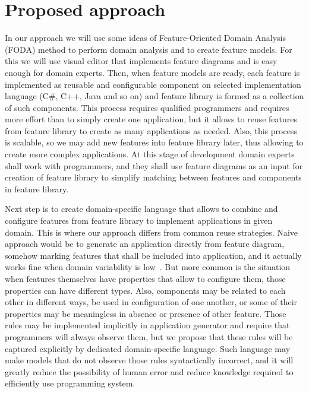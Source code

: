 \documentclass[conference]{IEEEtran}
\begin{document}
\section{Proposed approach}
\label{chapter:proposed}
In our approach we will use some ideas of Feature-Oriented Domain Analysis (FODA) method to perform domain analysis and to create feature models. For this we will use visual editor that implements feature diagrams and is easy enough for domain experts. Then, when feature models are ready, each feature is implemented as reusable and configurable component on selected implementation language (C\#, C++, Java and so on) and feature library is formed as a collection of such components. This process requires qualified programmers and requires more effort than to simply create one application, but it allows to reuse features from feature library to create as many applications as needed. Also, this process is scalable, so we may add new features into feature library later, thus allowing to create more complex applications. At this stage of development domain experts shall work with programmers, and they shall use feature diagrams as an input for creation of feature library to simplify matching between features and components in feature library.

Next step is to create domain-specific language that allows to combine and configure features from feature library to implement applications in given domain. This is where our approach differs from common reuse strategies. Naive approach would be to generate an application directly from feature diagram, somehow marking features that shall be included into application, and it actually works fine when domain variability is low~\cite{she2010variability}. But more common is the situation when features themselves have properties that allow to configure them, those properties can have different types. Also, components may be related to each other in different ways, be used in configuration of one another, or some of their properties may be meaningless in absence or presence of other feature. Those rules may be implemented implicitly in application generator and require that programmers will always observe them, but we propose that these rules will be captured explicitly by dedicated domain-specific language. Such language may make models that do not observe those rules syntactically incorrect, and it will greatly reduce the possibility of human error and reduce knowledge required to efficiently use programming system.
\end{document}
